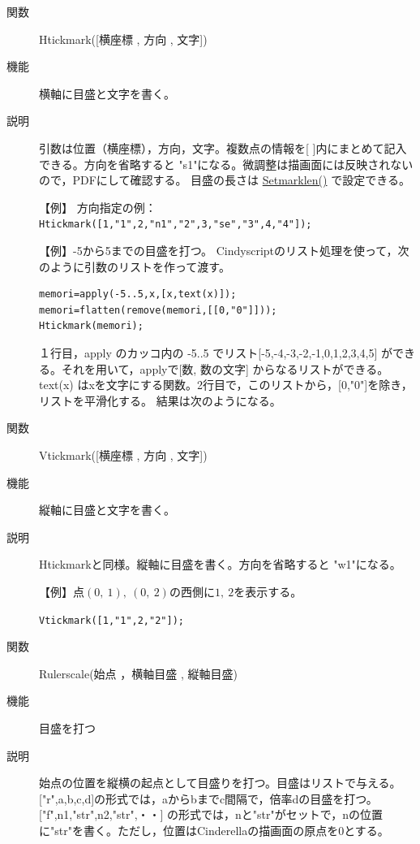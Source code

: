 \documentclass[papersize,a4paper,12pt,uplatex]{jsarticle}
\begin{document}
\begin{description}
\hypertarget{htickmark}{}
\item[関数]Htickmark([横座標 , 方向 , 文字])
\item[機能]横軸に目盛と文字を書く。
\item[説明]引数は位置（横座標），方向，文字。複数点の情報を[ ]内にまとめて記入できる。方向を省略すると "s1"になる。微調整は描画面には反映されないので，PDFにして確認する。
目盛の長さは \hyperlink{setmarklen}{Setmarklen()} で設定できる。

\vspace{\baselineskip}
【例】 方向指定の例：\verb|Htickmark([1,"1",2,"n1","2",3,"se","3",4,"4"]);|

\vspace{\baselineskip}
\begin{center}

\end{center}

【例】-5から5までの目盛を打つ。
Cindyscriptのリスト処理を使って，次のように引数のリストを作って渡す。
\begin{verbatim}
memori=apply(-5..5,x,[x,text(x)]);
memori=flatten(remove(memori,[[0,"0"]]));
Htickmark(memori);
\end{verbatim}
１行目，apply のカッコ内の -5..5 でリスト[-5,-4,-3,-2,-1,0,1,2,3,4,5] ができる。それを用いて，applyで[数, 数の文字] からなるリストができる。text(x) はxを文字にする関数。2行目で，このリストから，[0,"0"]を除き，リストを平滑化する。 結果は次のようになる。

\begin{center} \scalebox{0.8}{}\end{center}

\hypertarget{vtickmark}{}
\item[関数]Vtickmark([横座標 , 方向 , 文字])
\item[機能]縦軸に目盛と文字を書く。
\item[説明]Htickmarkと同様。縦軸に目盛を書く。方向を省略すると "w1"になる。

\vspace{\baselineskip}
【例】点$(0,\ 1),\ (0,\ 2)$の西側に$1,\ 2$を表示する。

\hspace{10mm}\verb|Vtickmark([1,"1",2,"2"]);|

\vspace{\baselineskip}
\hypertarget{rulerscale}{}
\item[関数]Rulerscale(始点 ，横軸目盛 , 縦軸目盛)
\item[機能]目盛を打つ
\item[説明]始点の位置を縦横の起点として目盛りを打つ。目盛はリストで与える。
["r",a,b,c,d]の形式では，aからbまでc間隔で，倍率dの目盛を打つ。
["f",n1,"str",n2,"str",・・] の形式では，nと"str"がセットで，nの位置に"str"を書く。ただし，位置はCinderellaの描画面の原点を0とする。


\end{description}
\end{document}
